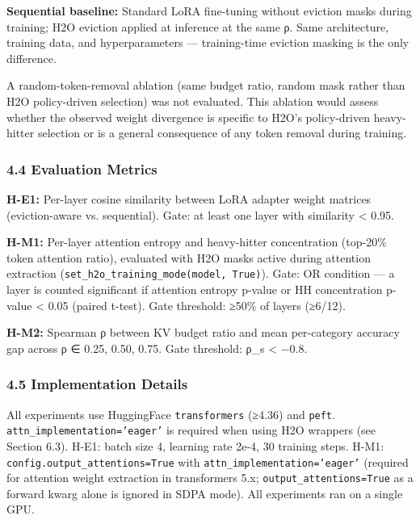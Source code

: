 \textbf{Sequential baseline:} Standard LoRA fine-tuning without eviction masks during training; H2O eviction applied at inference at the same ρ. Same architecture, training data, and hyperparameters — training-time eviction masking is the only difference.

A random-token-removal ablation (same budget ratio, random mask rather than H2O policy-driven selection) was not evaluated. This ablation would assess whether the observed weight divergence is specific to H2O's policy-driven heavy-hitter selection or is a general consequence of any token removal during training.

\subsubsection{4.4 Evaluation Metrics}

\textbf{H-E1:} Per-layer cosine similarity between LoRA adapter weight matrices (eviction-aware vs. sequential). Gate: at least one layer with similarity < 0.95.

\textbf{H-M1:} Per-layer attention entropy and heavy-hitter concentration (top-20\% token attention ratio), evaluated with H2O masks active during attention extraction (\texttt{set_h2o_training_mode(model, True)}). Gate: OR condition — a layer is counted significant if attention entropy p-value or HH concentration p-value < 0.05 (paired t-test). Gate threshold: ≥50\% of layers (≥6/12).

\textbf{H-M2:} Spearman ρ between KV budget ratio and mean per-category accuracy gap across ρ ∈ {0.25, 0.50, 0.75}. Gate threshold: ρ_s < −0.8.

\subsubsection{4.5 Implementation Details}

All experiments use HuggingFace \texttt{transformers} (≥4.36) and \texttt{peft}. \texttt{attn_implementation='eager'} is required when using H2O wrappers (see Section 6.3). H-E1: batch size 4, learning rate 2e-4, 30 training steps. H-M1: \texttt{config.output_attentions=True} with \texttt{attn_implementation='eager'} (required for attention weight extraction in transformers 5.x; \texttt{output_attentions=True} as a forward kwarg alone is ignored in SDPA mode). All experiments ran on a single GPU.

